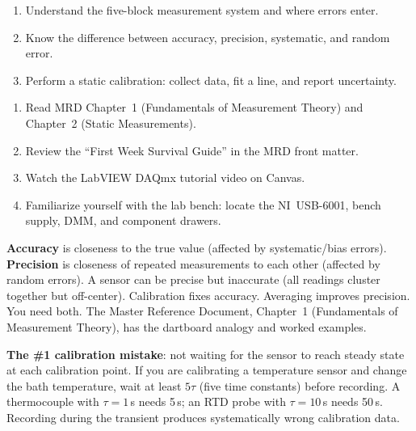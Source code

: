 \documentclass[11pt,letterpaper]{article}
\begin{document}
\begin{priorities}
\begin{enumerate}[leftmargin=*, itemsep=1pt, topsep=0pt]
    \item Understand the five-block measurement system and where errors enter.
    \item Know the difference between accuracy, precision, systematic, and random error.
    \item Perform a static calibration: collect data, fit a line, and report uncertainty.
\end{enumerate}
\end{priorities}

\begin{tcolorbox}[colback=minesblue!3, colframe=minesblue!40, boxrule=0.5pt, arc=2pt, left=6pt, right=6pt, top=3pt, bottom=3pt, fonttitle=\small\bfseries\color{minesblue}, title={Before You Start: Module 1}]
\small
\begin{enumerate}[nosep,leftmargin=*]
\item Read MRD Chapter~1 (Fundamentals of Measurement Theory) and Chapter~2 (Static Measurements).
\item Review the ``First Week Survival Guide'' in the MRD front matter.
\item Watch the LabVIEW DAQmx tutorial video on Canvas.
\item Familiarize yourself with the lab bench: locate the NI~USB-6001, bench supply, DMM, and component drawers.
\end{enumerate}
\end{tcolorbox}

\begin{faqbox}
\textbf{Accuracy} is closeness to the true value (affected by systematic/bias errors). \textbf{Precision} is closeness of repeated measurements to each other (affected by random errors). A sensor can be precise but inaccurate (all readings cluster together but off-center). Calibration fixes accuracy. Averaging improves precision. You need both. The Master Reference Document, Chapter~1 (Fundamentals of Measurement Theory), has the dartboard analogy and worked examples.
\end{faqbox}

\begin{warnbox}
\textbf{The \#1 calibration mistake}: not waiting for the sensor to reach steady state at each calibration point. If you are calibrating a temperature sensor and change the bath temperature, wait at least $5\tau$ (five time constants) before recording. A thermocouple with $\tau = 1$\,s needs 5\,s; an RTD probe with $\tau = 10$\,s needs 50\,s. Recording during the transient produces systematically wrong calibration data.
\end{warnbox}
\end{document}
